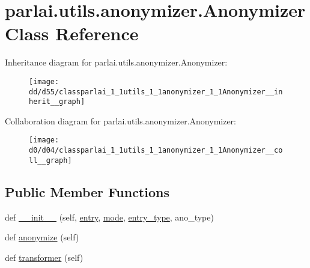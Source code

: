 \hypertarget{classparlai_1_1utils_1_1anonymizer_1_1Anonymizer}{}\section{parlai.\+utils.\+anonymizer.\+Anonymizer Class Reference}
\label{classparlai_1_1utils_1_1anonymizer_1_1Anonymizer}


Inheritance diagram for parlai.\+utils.\+anonymizer.\+Anonymizer\+:
\nopagebreak
\begin{figure}[H]
\begin{center}
\leavevmode
\texttt{[image: dd/d55/classparlai\_1\_1utils\_1\_1anonymizer\_1\_1Anonymizer\_\_inherit\_\_graph]}
\end{center}
\end{figure}


Collaboration diagram for parlai.\+utils.\+anonymizer.\+Anonymizer\+:
\nopagebreak
\begin{figure}[H]
\begin{center}
\leavevmode
\texttt{[image: d0/d04/classparlai\_1\_1utils\_1\_1anonymizer\_1\_1Anonymizer\_\_coll\_\_graph]}
\end{center}
\end{figure}
\subsection*{Public Member Functions}
\begin{DoxyCompactItemize}
\item 
def \hyperlink{classparlai_1_1utils_1_1anonymizer_1_1Anonymizer_abb5227ee9a889aff79a0c657c76ffd71}{\+\_\+\+\_\+init\+\_\+\+\_\+} (self, \hyperlink{classparlai_1_1utils_1_1anonymizer_1_1Anonymizer_a348d1fd062fa3f57ad81cce32e8dd2c7}{entry}, \hyperlink{classparlai_1_1utils_1_1anonymizer_1_1Anonymizer_a535b959cd821885d5af2831644cde735}{mode}, \hyperlink{classparlai_1_1utils_1_1anonymizer_1_1Anonymizer_a11c56824a15faa979c46dde2422a4a78}{entry\+\_\+type}, ano\+\_\+type)
\item 
def \hyperlink{classparlai_1_1utils_1_1anonymizer_1_1Anonymizer_a4853ffad71c52d910e68752ee7a05200}{anonymize} (self)
\item 
def \hyperlink{classparlai_1_1utils_1_1anonymizer_1_1Anonymizer_a515fed7848150c353175b42ebe7d06c1}{transformer} (self)
\end{DoxyCompactItemize}
